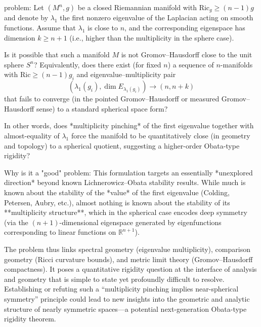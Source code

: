problem:  
Let \((M^n,g)\) be a closed Riemannian manifold with \(\mathrm{Ric}_g \ge (n-1)g\) and denote by \(\lambda_1\) the first nonzero eigenvalue of the Laplacian acting on smooth functions.  
Assume that \(\lambda_1\) is close to \(n\), and the corresponding eigenspace has dimension \(k \ge n+1\) (i.e., higher than the multiplicity in the sphere case).  

Is it possible that such a manifold \(M\) is not Gromov–Hausdorff close to the unit sphere \(S^n\)?  
Equivalently, does there exist (for fixed \(n\)) a sequence of \(n\)-manifolds with \(\mathrm{Ric} \ge (n-1)g_i\) and eigenvalue–multiplicity pair  
\[
(\lambda_1(g_i), \dim E_{\lambda_1(g_i)}) \to (n, n+k)
\]
that fails to converge (in the pointed Gromov–Hausdorff or measured Gromov–Hausdorff sense) to a standard spherical space form?  

In other words, does *multiplicity pinching* of the first eigenvalue together with almost-equality of \(\lambda_1\) force the manifold to be quantitatively close (in geometry and topology) to a spherical quotient, suggesting a higher-order Obata-type rigidity?

Why is it a "good" problem:  
This formulation targets an essentially *unexplored direction* beyond known Lichnerowicz–Obata stability results. While much is known about the stability of the *value* of the first eigenvalue (Colding, Petersen, Aubry, etc.), almost nothing is known about the stability of its **multiplicity structure**, which in the spherical case encodes deep symmetry (via the \((n+1)\)-dimensional eigenspace generated by eigenfunctions corresponding to linear functions on \(\mathbb{R}^{n+1}\)).  

The problem thus links spectral geometry (eigenvalue multiplicity), comparison geometry (Ricci curvature bounds), and metric limit theory (Gromov–Hausdorff compactness). It poses a quantitative rigidity question at the interface of analysis and geometry that is simple to state yet profoundly difficult to resolve. Establishing or refuting such a “multiplicity pinching implies near-spherical symmetry” principle could lead to new insights into the geometric and analytic structure of nearly symmetric spaces—a potential next-generation Obata-type rigidity theorem.